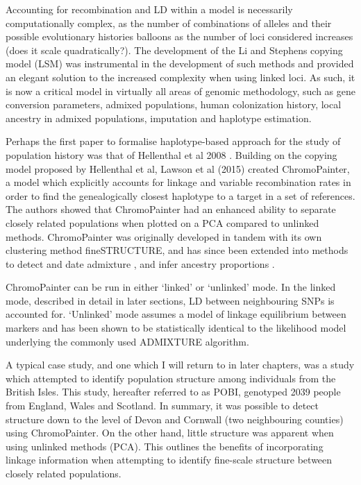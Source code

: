 Accounting for recombination and LD within a model is necessarily computationally complex, as the number of combinations of alleles and their possible evolutionary histories balloons as the number of loci considered increases (does it scale quadratically?). The development of the Li and Stephens copying model (LSM) \cite{Li2003} was instrumental in the development of such methods \cite{song2016li} and provided an elegant solution to the increased complexity when using linked loci. As such, it is now a critical model in virtually all areas of genomic methodology, such as gene conversion parameters, admixed populations, human colonization history, local ancestry in admixed populations, imputation and haplotype estimation. 

Perhaps the first paper to formalise  haplotype-based approach for the study of population history was that of Hellenthal et al 2008 \cite{hellenthal2008inferring}. Building on the copying model proposed by Hellenthal et al, Lawson et al (2015) \cite{Lawson2012} created ChromoPainter, a model which explicitly accounts for linkage and variable recombination rates in order to find the genealogically closest haplotype to a target in a set of references. The authors showed that ChromoPainter had an enhanced ability to separate closely related populations when plotted on a PCA compared to unlinked methods. ChromoPainter was originally developed in tandem with its own clustering method fineSTRUCTURE, and has since been extended into methods to detect and date admixture \cite{Hellenthal2014}, and infer ancestry proportions \cite{Chacon-Duque2018}. 

ChromoPainter can be run in either `linked' or `unlinked' mode. In the linked mode, described in detail in later sections, LD between neighbouring SNPs is accounted for. `Unlinked' mode assumes a model of linkage equilibrium between markers and has been shown to be statistically identical to the likelihood model underlying the commonly used ADMIXTURE algorithm. 

A typical case study, and one which I will return to in later chapters, was a study which attempted to identify population structure among individuals from the British Isles. This study, hereafter referred to as POBI, genotyped 2039 people from England, Wales and Scotland. In summary, it was possible to detect structure down to the level of Devon and Cornwall (two neighbouring counties) using ChromoPainter. On the other hand, little structure was apparent when using unlinked methods (PCA). This outlines the benefits of incorporating linkage information when attempting to identify fine-scale structure between closely related populations.


